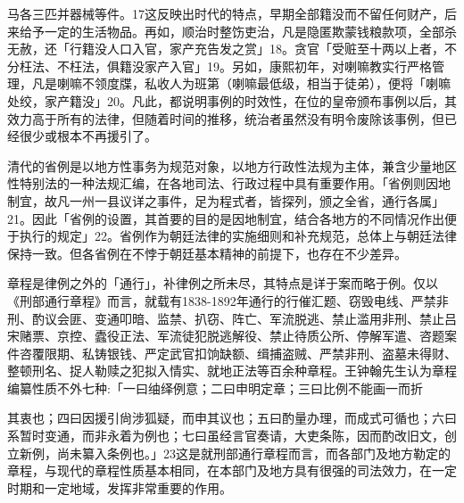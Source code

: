 \noindent 马各三匹并器械等件。17这反映出时代的特点，早期全部籍没而不留任何财产，后来给予一定的生活物品。再如，顺治时整饬吏治，凡是隐匿欺蒙钱粮款项，全部杀无赦，还「行籍没人口入官，家产充告发之赏」18。贪官「受赃至十两以上者，不分枉法、不枉法，俱籍没家产入官」19。另如，康熙初年，对喇嘛教实行严格管理，凡是喇嘛不领度牒，私收人为班第（喇嘛最低级，相当于徒弟），便将「喇嘛处绞，家产籍没」20。凡此，都说明事例的时效性，在位的皇帝颁布事例以后，其效力高于所有的法律，但随着时间的推移，统治者虽然没有明令废除该事例，但已经很少或根本不再援引了。

清代的省例是以地方性事务为规范对象，以地方行政性法规为主体，兼含少量地区性特别法的一种法规汇编，在各地司法、行政过程中具有重要作用。「省例则因地制宜，故凡一州一县议详之事件，足为程式者，皆探列，颁之全省，通行各属」21。因此「省例的设置，其首要的目的是因地制宜，结合各地方的不同情况作出便于执行的规定」22。省例作为朝廷法律的实施细则和补充规范，总体上与朝廷法律保持一致。但各省例在不悖于朝廷基本精神的前提下，也存在不少差异。

章程是律例之外的「通行」，补律例之所未尽，其特点是详于案而略于例。仅以《刑部通行章程》而言，就载有1838-1892年通行的行催汇题、窃毁电线、严禁非刑、酌议会匪、变通叩暗、监禁、扒窃、阵亡、军流脱逃、禁止滥用非刑、禁止吕宋赌票、京控、蠹役正法、军流徒犯脱逃解役、禁止待质公所、停解军遣、咨题案件咨覆限期、私铸银钱、严定武官扣饷缺额、缉捕盗贼、严禁非刑、盗墓未得财、整顿刑名、捉人勒赎之犯拟入情实、就地正法等百余种章程。王钟翰先生认为章程编纂性质不外七种:「一曰䌷绎例意；二曰申明定章；三曰比例不能画一而折

\vfill
\begin{BookNotes}
\end{BookNotes}

\noindent 其衷也；四曰因援引尙涉狐疑，而申其议也；五曰酌量办理，而成式可循也；六曰系暂时变通，而非永着为例也；七曰虽经言官奏请，大吏条陈，因而酌改旧文，创立新例，尚未纂入条例也。」23这是就刑部通行章程而言，而各部门及地方勒定的章程，与现代的章程性质基本相同，在本部门及地方具有很强的司法效力，在一定时期和一定地域，发挥非常重要的作用。


